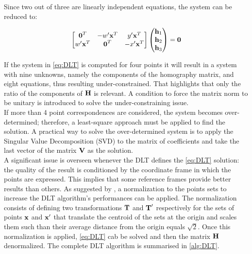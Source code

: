 Since two out of three are linearly independent equations, the system can be reduced to:

\begin{equation}
\label{eq:DLT}
    \begin{bmatrix}
        \mathrm{\textbf{0}}^T & -w'\mathrm{\textbf{x}}^T  & y'\mathrm{\textbf{x}}^T\\
        w'\mathrm{\textbf{x}}^T & \mathrm{\textbf{0}}^T  & -x'\mathrm{\textbf{x}}^T\\
    \end{bmatrix}\begin{pmatrix}
        \mathrm{\textbf{h}}_1 \\ \mathrm{\textbf{h}}_2 \\ \mathrm{\textbf{h}}_3
    \end{pmatrix} =  \mathrm{\textbf{0}}
\end{equation}

If the system in \cref{eq:DLT} is computed for four points it will result in a system with nine unknowns, namely the components of the homography matrix, and eight equations, thus resulting under-constrained. That highlights that only the ratio of the components of $\mathrm{\textbf{H}}$ is relevant. 
A condition to force the matrix norm to be unitary is introduced to solve the under-constraining issue.\\
If more than 4 point correspondences are considered, the system becomes over-determined; therefore, a least-square approach must be applied to find the solution. A practical way to solve the over-determined system is to apply the Singular Value Decomposition (SVD) to the matrix of coefficients and take the last vector of the matrix $\mathrm{\textbf{V}}$ as the solution.\\
A significant issue is overseen whenever the DLT defines the \cref{eq:DLT} solution: the quality of the result is conditioned by the coordinate frame in which the points are expressed.
This implies that some reference frames provide better results than others. As suggested by \cite{hartley2003multiple}, a normalization to the points sets to increase the DLT algorithm's performances can be applied. The normalization consists of defining two transformations $\mathrm{\textbf{T}}$ and $\mathrm{\textbf{T}}'$ respectively for the sets of points $\mathrm{\textbf{x}}$ and $\mathrm{\textbf{x}}'$ that translate the centroid of the sets at the origin and scales them such than their average distance from the origin equals $\sqrt{2}$. Once this normalization is applied, \cref{eq:DLT} cab be solved and then the matrix  $\mathrm{\textbf{H}}$ denormalized. The complete DLT algorithm is summarised in \cref{alg:DLT}.

